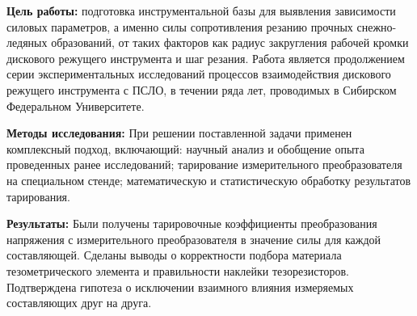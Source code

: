 \textbf{Цель работы:} подготовка инструментальной базы для выявления зависимости силовых параметров, а именно силы сопротивления резанию прочных снежно-ледяных образований, от таких факторов как радиус закругления рабочей кромки дискового режущего инструмента и шаг резания. Работа является продолжением серии экспериментальных исследований процессов взаимодействия дискового режущего инструмента с ПСЛО, в течении ряда лет, проводимых в Сибирском Федеральном Университете.

\textbf{Методы исследования:} При решении поставленной задачи применен комплексный подход, включающий: научный анализ и обобщение опыта проведенных ранее исследований; тарирование измерительного преобразователя на специальном стенде; математическую и статистическую обработку результатов тарирования.

\textbf{Результаты:} Были получены тарировочные коэффициенты преобразования напряжения с измерительного преобразователя в значение силы для каждой составляющей. Сделаны выводы о корректности подбора материала тезометрического элемента и правильности наклейки тезорезисторов. Подтверждена гипотеза о исключении взаимного влияния измеряемых составляющих друг на друга.

